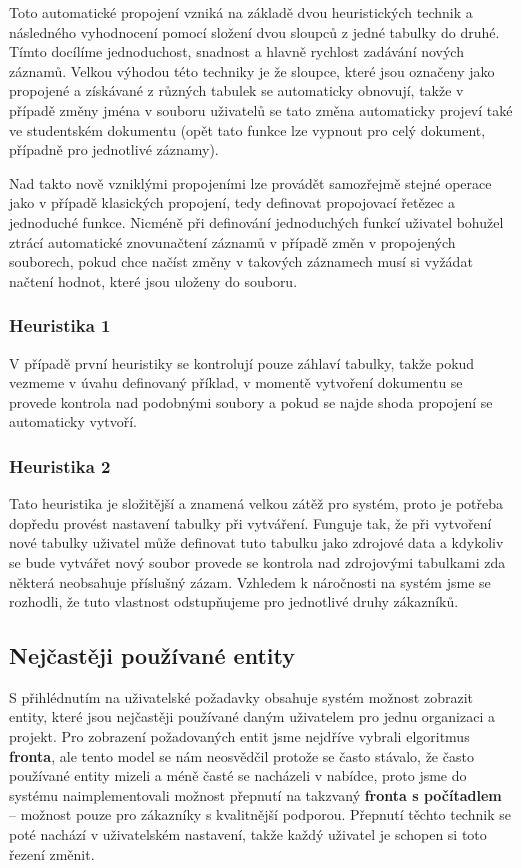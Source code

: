 \par Toto automatické propojení vzniká na základě dvou heuristických technik a následného vyhodnocení pomocí složení dvou sloupců z jedné tabulky do druhé. Tímto docílíme jednoduchost, snadnost a hlavně rychlost zadávání nových záznamů. Velkou výhodou této techniky je že sloupce, které jsou označeny jako propojené a získávané z různých tabulek se automaticky obnovují, takže v případě změny jména v souboru uživatelů se tato změna automaticky projeví také ve studentském dokumentu (opět tato funkce lze vypnout pro celý dokument, případně pro jednotlivé záznamy).

\par Nad takto nově vzniklými propojeními lze provádět samozřejmě stejné operace jako v případě klasických propojení, tedy definovat propojovací řetězec a jednoduché funkce. Nicméně při definování jednoduchých funkcí uživatel bohužel ztrácí automatické znovunačtení záznamů v případě změn v propojených souborech, pokud chce načíst změny v takových záznamech musí si vyžádat načtení hodnot, které jsou uloženy do souboru.

\subsubsection{Heuristika 1}
\par V případě první heuristiky se kontrolují pouze záhlaví tabulky, takže pokud vezmeme v úvahu definovaný příklad, v momentě vytvoření dokumentu se provede kontrola nad podobnými soubory a pokud se najde shoda propojení se automaticky vytvoří.
\subsubsection{Heuristika 2}
\par Tato heuristika je složitější a znamená velkou zátěž pro systém, proto je potřeba dopředu provést nastavení tabulky při vytváření. Funguje tak, že při vytvoření nové tabulky uživatel může definovat tuto tabulku jako zdrojové data a kdykoliv se bude vytvářet nový soubor provede se kontrola nad zdrojovými tabulkami zda některá neobsahuje příslušný zázam. Vzhledem k náročnosti na systém jsme se rozhodli, že tuto vlastnost odstupňujeme pro jednotlivé druhy zákazníků.

\subsection{Nejčastěji používané entity}
\par S přihlédnutím na uživatelské požadavky obsahuje systém možnost zobrazit entity, které jsou nejčastěji používané daným uživatelem pro jednu organizaci a projekt. Pro zobrazení požadovaných entit jsme nejdříve vybrali elgoritmus \textbf{fronta}, ale tento model se nám neosvědčil protože se často stávalo, že často používané entity mizeli a méně časté se nacházeli v nabídce, proto jsme do systému naimplementovali možnost přepnutí na takzvaný \textbf{fronta s počítadlem} -- možnost pouze pro zákazníky s kvalitnější podporou. Přepnutí těchto technik se poté nachází v uživatelském nastavení, takže každý uživatel je schopen si toto řezení změnit.

